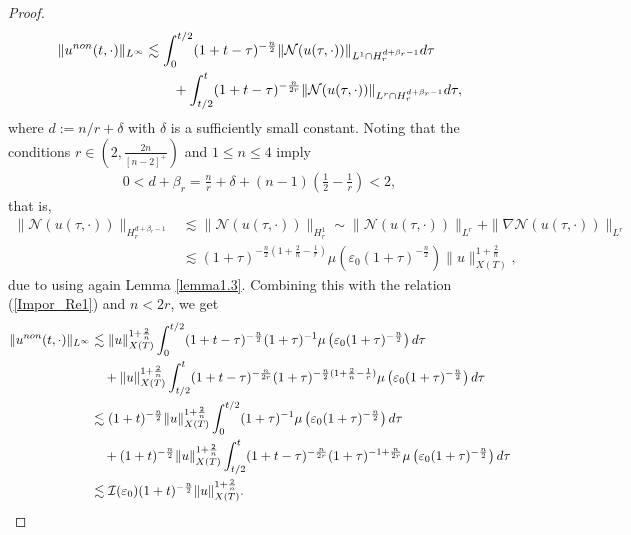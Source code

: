 \documentclass[10pt,a4paper]{amsart}
\begin{document}
\begin{proof}
    \begin{align*}
        \|u^{\rm non}(t,\cdot)\|_{L^\infty} &\lesssim \int_0^{t/2} (1+t-\tau)^{-\frac{n}{2}} \|\mathcal{N}(u(\tau,\cdot))\|_{L^1 \cap H_r^{d+\beta_r-1}} d\tau\\
        &\qquad +\int_{t/2}^t (1+t-\tau)^{-\frac{n}{2r}} \|\mathcal{N}(u(\tau,\cdot))\|_{L^r \cap H_r^{d+\beta_r-1}} d\tau,
    \end{align*}
    where $d := n/r +\delta$ with $\delta$ is a sufficiently small constant. 
Noting that the conditions $r \in \left(2, \displaystyle\frac{2n}{[n-2]^+}\right)$ and $1 \leq n \leq 4$ imply
\begin{align}
    0 < d + \beta_r = \frac{n}{r} +\delta + (n-1)\left(\frac{1}{2}-\frac{1}{r}\right) < 2,  \label{Re10}
\end{align}
   that is, 
   \begin{align*}
       \| \mathcal{N}(u(\tau,\cdot))\|_{H_r^{d+\beta_r-1}} &\lesssim \| \mathcal{N}(u(\tau,\cdot))\|_{H_r^1} \sim \|\mathcal{N}(u(\tau,\cdot))\|_{L^r} + \|\nabla \mathcal{N}(u(\tau,\cdot))\|_{L^r}\\ 
       &\lesssim (1+\tau)^{-\frac{n}{2}(1+\frac{2}{n}-\frac{1}{r})} \mu\left(\varepsilon_0 (1+\tau)^{-\frac{n}{2}}\right) \|u\|_{X(T)}^{1+\frac{2}{n}},
   \end{align*}
   due to using again Lemma \ref{lemma1.3}. Combining this with the relation (\ref{Impor_Re1}) and $n < 2r$, we get
   \begin{align}
       \|u^{\rm non}(t,\cdot)\|_{L^\infty} &\lesssim \|u\|_{X(T)}^{1+\frac{2}{n}}\int_0^{t/2} (1+t-\tau)^{-\frac{n}{2}} (1+\tau)^{-1} \mu\left(\varepsilon_0(1+\tau)^{-\frac{n}{2}}\right) d\tau \notag\\
       &\quad+ \|u\|_{X(T)}^{1+\frac{2}{n}} \int_{t/2}^t (1+t-\tau)^{-\frac{n}{2r}} (1+\tau)^{-\frac{n}{2}(1+\frac{2}{n}-\frac{1}{r})} \mu\left(\varepsilon_0 (1+\tau)^{-\frac{n}{2}}\right) d\tau \notag\\
       &\lesssim (1+t)^{-\frac{n}{2}} \|u\|_{X(T)}^{1+\frac{2}{n}} \int_0^{t/2} (1+\tau)^{-1} \mu\left(\varepsilon_0 (1+\tau)^{-\frac{n}{2}}\right) d\tau \notag\\
       &\quad + (1+t)^{-\frac{n}{2}} \|u\|_{X(T)}^{1+\frac{2}{n}} \int_{t/2}^t (1+t-\tau)^{-\frac{n}{2r}} (1+\tau)^{-1+\frac{n}{2r}}  \mu\left(\varepsilon_0 (1+\tau)^{-\frac{n}{2}}\right) d\tau \notag\\
       &\lesssim \mathcal{I}(\varepsilon_0) (1+t)^{-\frac{n}{2}} \|u\|_{X(T)}^{1+\frac{2}{n}}. \label{Main.Es.2}
   \end{align}

\end{proof}
\end{document}

